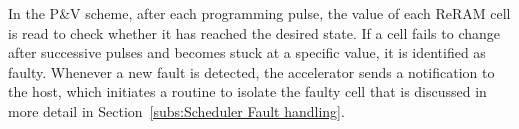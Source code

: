 In the P\&V scheme, after each programming pulse, the value of each ReRAM cell is read to check whether it has reached the desired state. If a cell fails to change after successive pulses and becomes stuck at a specific value, it is identified as faulty. Whenever a new fault is detected, the accelerator sends a notification to the host, which initiates a routine to isolate the faulty cell that is discussed in more detail in Section~\ref{subs:Scheduler Fault handling}.



